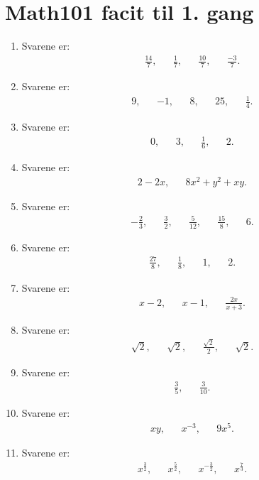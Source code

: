 \section{Math101 facit til 1. gang}

\begin{enumerate}
\item Svarene er:
\begin{align*}
\frac{14}{7},&& \frac{1}{7},&& \frac{10}{7},&& \frac{-3}{7}.
\end{align*}

\item Svarene er:
\begin{align*}
9,&& -1,&& 8,&& 25,&& \frac{1}{4}.
\end{align*}

\item Svarene er:
\begin{align*}
0,&& 3,&& \frac{1}{6},&& 2.
\end{align*}
\item Svarene er:
\begin{align*}
2-2x,&& 8x^2+y^2+xy.
\end{align*}

\item Svarene er:
\begin{align*}
-\frac{2}{3},&&\frac{3}{2},&& \frac{5}{12},&& \frac{15}{8},&& 6.
\end{align*}

\item Svarene er:
\begin{align*}
\frac{27}{8},&& \frac{1}{8},&& 1,&& 2.
\end{align*}

\item Svarene er:
\begin{align*}
x-2,&& x-1,&&\frac{2x}{x+3}.
\end{align*}

\item Svarene er:
\begin{align*}
\sqrt{2},&& \sqrt{2},&& \frac{\sqrt{2}}{2},&& \sqrt{2}.
\end{align*}

\item Svarene er:
\begin{align*}
\frac{3}{5},&&\frac{3}{10}.
\end{align*}

\item Svarene er:
\begin{align*}
xy,&& x^{-3},&& 9x^5.
\end{align*}




\item Svarene er:
\begin{align*}
x^{\frac{3}{2}},&& x^{\frac{5}{2}},&& x^{-\frac{3}{2}},&& x^{\frac{7}{3}}.
\end{align*}



















\end{enumerate}


